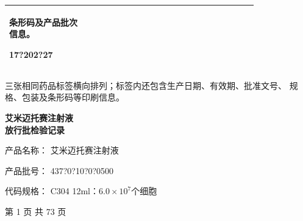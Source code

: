 \documentclass[UTF8,10pt,a4paper,fontset=fandol]{ctexart}
\newcommand{\fieldvalue}[1]{#1}
\newcommand{\handwritten}[1]{#1}
\begin{document}
\begin{center}
{\begin{minipage}{0.92\textheight}
\begin{tabular}{|p{0.27\linewidth}|p{0.27\linewidth}|p{0.27\linewidth}|}
\begin{minipage}[t]{\linewidth}
\vspace{3mm}
条形码及产品批次信息。

\fieldvalue{\handwritten{17?202?27}}
\end{minipage}
\\ \hline
\end{tabular}

\vspace{4mm}
\small
三张相同药品标签横向排列；标签内还包含生产日期、有效期、批准文号、
规格、包装及条形码等印刷信息。
\end{minipage}}
\end{center}


\newpage

\begin{center}
{\Large \textbf{艾米迈托赛注射液}}\\[1.2em]
{\Large \textbf{放行批检验记录}}
\end{center}

\vspace{3em}

\noindent
产品名称：\hspace{1em}%
\fieldvalue{艾米迈托赛注射液}

\vspace{1.5em}

\noindent
产品批号：\hspace{1em}%
\fieldvalue{\handwritten{437?0?10?0?0500}}

\vspace{1.5em}

\noindent
代码规格：\hspace{1em}%
\fieldvalue{C304 \quad 12ml：$6.0\times 10^7$个细胞}

\vfill

\begin{center}
第 1 页 共 73 页
\end{center}

\newpage
\end{document}
